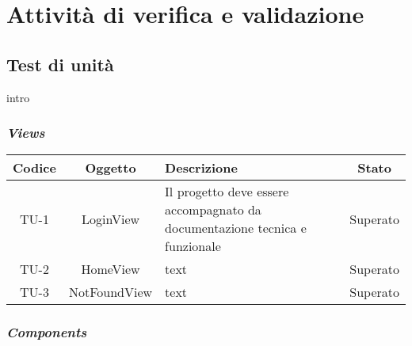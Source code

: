 \chapter{Attività di verifica e validazione}
\label{cap:verifica-validazione}


\section{Test di unità}
intro

\subsection*{\emph{Views}}

\begin{center}
  \label{tab:test-unita-views}
  \begin{longtable}{|c|c|p{}|c|}
  \hline
  \textbf{Codice} & \textbf{Oggetto} & \textbf{Descrizione} & \textbf{Stato}\\
  \hline
  TU-1 &LoginView &Il progetto deve essere accompagnato da documentazione tecnica e funzionale & Superato \\
  \hline
  TU-2 &HomeView &text &Superato \\
  \hline
  TU-3 &NotFoundView &text &Superato \\
  \hline
\end{longtable}
\end{center}

\subsection*{\emph{Components}}

